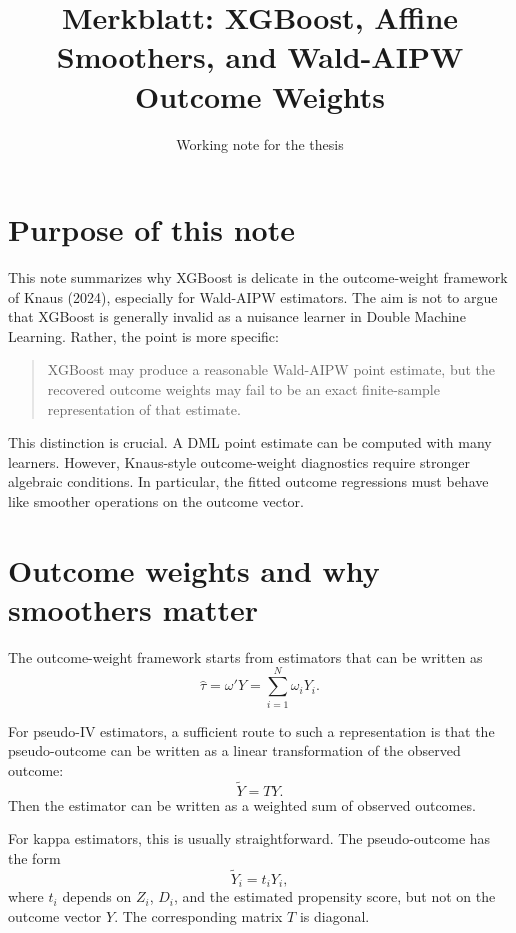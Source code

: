 \documentclass[11pt,a4paper]{article}
\title{Merkblatt: XGBoost, Affine Smoothers, and Wald-AIPW Outcome Weights}
\author{Working note for the thesis}
\date{}
\begin{document}
\maketitle

\section{Purpose of this note}

This note summarizes why XGBoost is delicate in the outcome-weight framework of
Knaus (2024), especially for Wald-AIPW estimators. The aim is not to argue that
XGBoost is generally invalid as a nuisance learner in Double Machine Learning.
Rather, the point is more specific:

\begin{quote}
XGBoost may produce a reasonable Wald-AIPW point estimate, but the recovered
outcome weights may fail to be an exact finite-sample representation of that
estimate.
\end{quote}

This distinction is crucial. A DML point estimate can be computed with many
learners. However, Knaus-style outcome-weight diagnostics require stronger
algebraic conditions. In particular, the fitted outcome regressions must behave
like smoother operations on the outcome vector.

\section{Outcome weights and why smoothers matter}

The outcome-weight framework starts from estimators that can be written as
\begin{equation}
    \hat\tau = \omega'Y = \sum_{i=1}^N \omega_i Y_i .
    \label{eq:omega_rep}
\end{equation}

For pseudo-IV estimators, a sufficient route to such a representation is that the
pseudo-outcome can be written as a linear transformation of the observed outcome:
\begin{equation}
    \tilde Y = TY .
    \label{eq:pseudo_outcome}
\end{equation}
Then the estimator can be written as a weighted sum of observed outcomes.

For kappa estimators, this is usually straightforward. The pseudo-outcome has the
form
\begin{equation}
    \tilde Y_i = t_i Y_i,
\end{equation}
where \(t_i\) depends on \(Z_i\), \(D_i\), and the estimated propensity score, but
not on the outcome vector \(Y\). The corresponding matrix \(T\) is diagonal.
\end{document}
